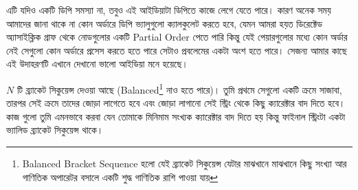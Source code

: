 এটি যদিও একটি ডিপি সমস্যা না, তবুও এই আইডিয়াটা ডিপিতে কাজে লেগে যেতে পারে। কারণ অনেক সময় আমাদের জানা থাকে না কোন অর্ডারে ডিপি ভ্যালুগুলো ক্যালকুলেট করতে হবে, যেমন আমরা হয়ত ডিরেক্টেড অ্যাসাইক্লিক গ্রাফ থেকে নোডগুলোর একটি Partial Order পেতে পারি কিন্তু যেই পেয়ারগুলোর মধ্যে কোন অর্ডার নেই সেগুলো কোন অর্ডারে প্রসেস করতে হতে পারে সেটাও প্রবলেমের একটা অংশ হতে পারে। সেজন্য আমার কাছে এই উদাহরণটি এখানে দেখানো ভালো আইডিয়া মনে হয়েছে।

\begin{problem}
$N$ টি ব্র্যাকেট সিকুয়েন্স দেওয়া আছে (Balanced\footnote{Balanced Bracket Sequence হলো যেই ব্র্যাকেট সিকুয়েন্স যেটার মাঝখানে মাঝখানে কিছু সংখ্যা আর গাণিতিক অপারেটর বসালে একটি শুদ্ধ গাণিতিক রাশি পাওয়া যায়} নাও হতে পারে)। তুমি প্রথমে সেগুলো একটি ক্রমে সাজাবা, তারপর সেই ক্রমে তাদের জোড়া  লাগেতে হবে এবং জোড়া লাগানো সেই স্ট্রিং থেকে কিছু ক্যারেক্টার বাদ দিতে হবে। কাজ গুলো তুমি এমনভাবে করবা যেন তোমাকে মিনিমাম সংখ্যক ক্যারেক্টার বাদ দিতে হয় কিন্তু ফাইনাল স্ট্রিংটা একটা ভ্যালিড ব্র্যাকেট সিকুয়েন্স থাকে।
\end{problem}
